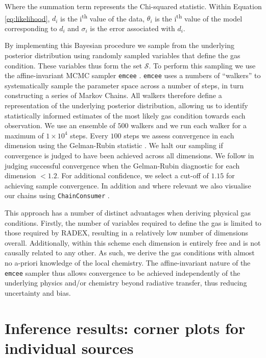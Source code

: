 \documentclass[twocolumn]{aastex631}
\begin{document}
Where the summation term represents the Chi-squared statistic. Within Equation \ref{eq:likelihood}, $d_{i}$ is the i\textsuperscript{th} value of the data, $\theta_{i}$ is the i\textsuperscript{th} value of the model corresponding to $d_{i}$ and $\sigma_{i}$ is the error associated with $d_{i}$. 

By implementing this Bayesian procedure we sample from the underlying posterior distribution using randomly sampled variables that define the gas condition. These variables thus form the set $\mathcal{S}$. To perform this sampling we use the affine-invariant MCMC sampler \texttt{emcee} \citep{emcee}. \texttt{emcee} uses a numbers of ``walkers'' to systematically sample the parameter space across a number of steps, in turn constructing a series of Markov Chains. All walkers therefore define a representation of the underlying posterior distribution, allowing us to identify statistically informed estimates of the most likely gas condition towards each observation. We use an ensemble of $500$ walkers and we run each walker for a maximum of $1\times10^{4}$ steps. Every $100$ steps we assess convergence in each dimension using the Gelman-Rubin statistic \citep{gelmanRubin}. We halt our sampling if convergence is judged to have been achieved across all dimensions. We follow \citet{brooksAndGelman} in judging successful convergence when the Gelman-Rubin diagnostic for each dimension $< 1.2$. For additional confidence, we select a cut-off of $1.15$ for achieving sample convergence. In addition and where relevant we also visualise our chains using \texttt{ChainConsumer} \citep{chainConsumer}.

This approach has a number of distinct advantages when deriving physical gas conditions. Firstly, the number of variables required to define the gas is limited to those required by RADEX, resulting in a relatively low number of dimensions overall. Additionally, within this scheme each dimension is entirely free and is not causally related to any other. As such, we derive the gas conditions with almost no a-priori knowledge of the local chemistry. The affine-invariant nature of the \texttt{emcee} sampler thus allows convergence to be achieved independently of the underlying physics and/or chemistry beyond radiative transfer, thus reducing uncertainty and bias.


\section{Inference results: corner plots for individual sources} \label{sec:corner-plots}
\end{document}
